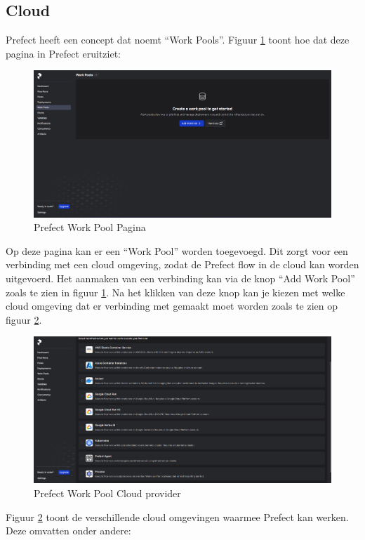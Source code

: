 \subsection{Cloud}
Prefect heeft een concept dat noemt ``Work Pools''. Figuur \ref{fig:Prefect_Work_Pools} toont hoe dat deze pagina in Prefect eruitziet:
\begin{figure}[htbp]
    \includegraphics[width=\linewidth]{graphics/Prefect_Work_Pools.PNG}
    \caption{Prefect Work Pool Pagina}
    \label{fig:Prefect_Work_Pools}
\end{figure}
Op deze pagina kan er een ``Work Pool'' worden toegevoegd. Dit zorgt voor een verbinding met een cloud omgeving, zodat de Prefect flow in de cloud kan worden uitgevoerd. Het aanmaken van een verbinding kan via de knop ``Add Work Pool'' zoals te zien in figuur \ref{fig:Prefect_Work_Pools}.
Na het klikken van deze knop kan je kiezen met welke cloud omgeving dat er verbinding met gemaakt moet worden zoals te zien op figuur \ref{fig:Prefect_Work_Pools_Create}.
\begin{figure}[htbp]
    \includegraphics[width=\linewidth]{graphics/Prefect_Work_Pools_Create.PNG}
    \caption{Prefect Work Pool Cloud provider}
    \label{fig:Prefect_Work_Pools_Create}
\end{figure}
Figuur \ref{fig:Prefect_Work_Pools_Create} toont de verschillende cloud omgevingen waarmee Prefect kan werken. Deze omvatten onder andere:
